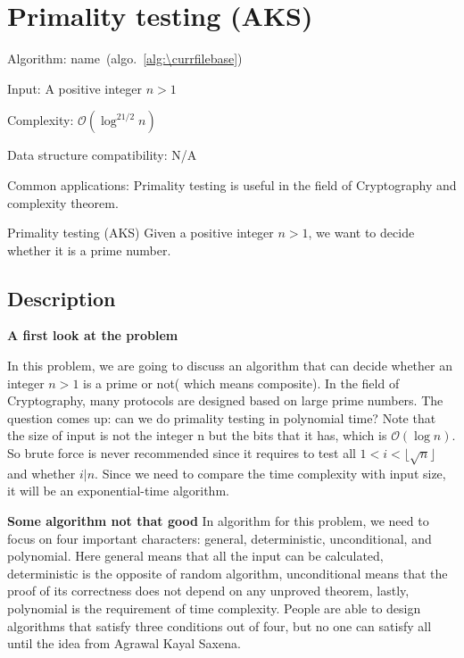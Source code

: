 \documentclass[catalog.tex]{subfiles}
\begin{document}
\def\pbname{Primality testing (AKS)} %

\section{\pbname} 

\begin{overview}
\item [Algorithm:] name~(algo.~\ref{alg:\currfilebase}) 
\item [Input:] A positive integer $n > 1$
\item [Complexity:] $\mathcal{O}(\log^{21/2} n)$
\item [Data structure compatibility:] N/A
\item [Common applications:] Primality testing is useful in the field of Cryptography and complexity theorem.
\end{overview}


\begin{problem}{\pbname}
	Given a positive integer $n > 1$, we want to decide whether it is a prime number.
\end{problem}


\subsection*{Description}

\textbf{A first look at the problem}

In this problem, we are going to discuss an algorithm that can decide whether an integer $n>1$ is a prime or not( which means composite). In the field of Cryptography, many protocols are designed based on large prime numbers. The question comes up: can we do primality testing in polynomial time? Note that the size of input is not the integer n but the bits that it has, which is $\mathcal{O} (\log n)$. So brute force is never recommended since it requires to test all $1<i<\lfloor \sqrt{n}\rfloor$ and whether $i|n$. Since we need to compare the time complexity with input size, it will be an exponential-time algorithm. 

\textbf{Some algorithm not that good}
In algorithm for this problem, we need to focus on four important characters: general, deterministic, unconditional, and polynomial\cite{AKS}. Here general means that all the input can be calculated, deterministic is the opposite of random algorithm, unconditional means that the proof of its correctness does not depend on any unproved theorem, lastly, polynomial is the requirement of time complexity. People are able to design algorithms that satisfy three conditions out of four, but no one can satisfy all until the idea from Agrawal Kayal Saxena. 
\end{document}
